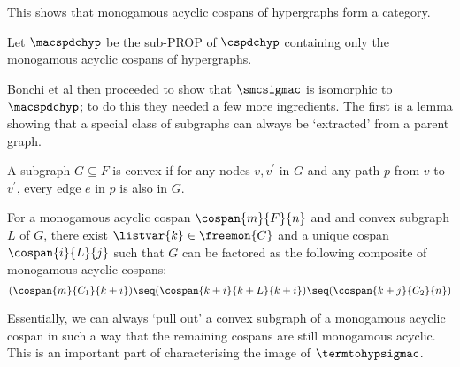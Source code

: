 This shows that monogamous acyclic cospans of hypergraphs form a category.

\begin{definition}
    Let \(\macspdchyp\) be the sub-PROP of \(\cspdchyp\) containing only the
    monogamous acyclic cospans of hypergraphs.
\end{definition}

Bonchi et al then proceeded to show that \(\smcsigmac\) is isomorphic to
\(\macspdchyp\); to do this they needed a few more ingredients.
The first is a lemma showing that a special class of subgraphs can always be
`extracted' from a parent graph.

\begin{definition}
    A subgraph \(G \subseteq F\) is convex if for any nodes \(v, v^\prime\) in
    \(G\) and any path \(p\) from \(v\) to \(v^\prime\), every edge \(e\) in
    \(p\) is also in \(G\).
\end{definition}

\begin{lemma}
    \label{lem:decomposition}
    For a monogamous acyclic cospan \(\cospan{m}{F}{n}\) and
    and convex subgraph \(L\) of \(G\), there exist
    \(\listvar{k} \in \freemon{C}\) and a unique cospan
    \(\cospan{i}{L}{j}\) such that \(G\) can be factored as
    the following composite of monogamous acyclic cospans:
    \[
        (\cospan{m}{C_1}{k + i})
        \seq
        (\cospan{
            k + i
        }{
            k + L
        }{
            k + i
        })
        \seq
        (\cospan{k + j}{C_2}{n})
    \]
\end{lemma}

Essentially, we can always `pull out' a convex subgraph of a monogamous acyclic
cospan in such a way that the remaining cospans are still monogamous acyclic.
This is an important part of characterising the image of \(\termtohypsigmac\).

